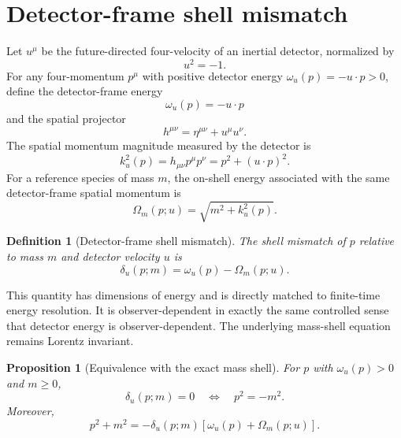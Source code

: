 \documentclass[11pt]{article}
\newtheorem{proposition}{Proposition}
\newtheorem{definition}{Definition}
\theoremstyle{remark}
\begin{document}
\section{Detector-frame shell mismatch}

Let $u^\mu$ be the future-directed four-velocity of an inertial detector, normalized by
\begin{equation}
  u^2=-1.
\end{equation}
For any four-momentum $p^\mu$ with positive detector energy $\omega_u(p)=-u\cdot p>0$, define the detector-frame energy
\begin{equation}
  \omega_u(p)=-u\cdot p
  \label{eq:detector-energy}
\end{equation}
and the spatial projector
\begin{equation}
  h^{\mu\nu}=\eta^{\mu\nu}+u^\mu u^\nu.
\end{equation}
The spatial momentum magnitude measured by the detector is
\begin{equation}
  k_u^2(p)=h_{\mu\nu}p^\mu p^\nu
  =p^2+(u\cdot p)^2.
\end{equation}
For a reference species of mass $m$, the on-shell energy associated with the same detector-frame spatial momentum is
\begin{equation}
  \Omega_m(p;u)=\sqrt{m^2+k_u^2(p)}.
  \label{eq:on-shell-energy}
\end{equation}

\begin{definition}[Detector-frame shell mismatch]
The shell mismatch of $p$ relative to mass $m$ and detector velocity $u$ is
\begin{equation}
  \delta_u(p;m)
  =\omega_u(p)-\Omega_m(p;u).
  \label{eq:shell-mismatch}
\end{equation}
\end{definition}

This quantity has dimensions of energy and is directly matched to finite-time energy resolution. It is observer-dependent in exactly the same controlled sense that detector energy is observer-dependent. The underlying mass-shell equation remains Lorentz invariant.

\begin{proposition}[Equivalence with the exact mass shell]
For $p$ with $\omega_u(p)>0$ and $m\ge 0$,
\begin{equation}
  \delta_u(p;m)=0
  \quad\Longleftrightarrow\quad
  p^2=-m^2.
  \label{eq:equivalence}
\end{equation}
Moreover,
\begin{equation}
  p^2+m^2
  =-\delta_u(p;m)
  \left[\omega_u(p)+\Omega_m(p;u)\right].
  \label{eq:virtuality-mismatch-relation}
\end{equation}
\end{proposition}
\end{document}
